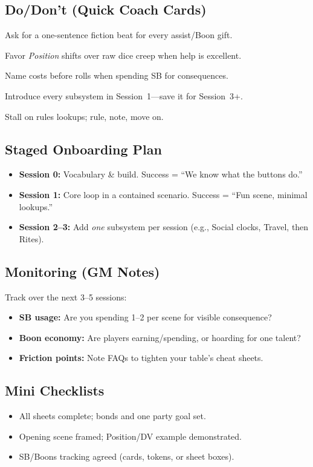 \subsection*{Do/Don’t (Quick Coach Cards)}
\begin{description}[leftmargin=1.6em]
  \item[\textbf{Do}] Ask for a one-sentence fiction beat for every assist/Boon gift.
  \item[\textbf{Do}] Favor \emph{Position} shifts over raw dice creep when help is excellent.
  \item[\textbf{Do}] Name costs before rolls when spending SB for consequences.
  \item[\textbf{Don’t}] Introduce every subsystem in Session~1—save it for Session~3+.
  \item[\textbf{Don’t}] Stall on rules lookups; rule, note, move on.
\end{description}

\subsection*{Staged Onboarding Plan}
\begin{itemize}
  \item \textbf{Session 0:} Vocabulary \& build. Success = “We know what the buttons do.”
  \item \textbf{Session 1:} Core loop in a contained scenario. Success = “Fun scene, minimal lookups.”
  \item \textbf{Session 2–3:} Add \emph{one} subsystem per session (e.g., Social clocks, Travel, then Rites).
\end{itemize}

\subsection*{Monitoring (GM Notes)}
Track over the next 3–5 sessions:
\begin{itemize}
  \item \textbf{SB usage:} Are you spending 1–2 per scene for visible consequence?
  \item \textbf{Boon economy:} Are players earning/spending, or hoarding for one talent?
  \item \textbf{Friction points:} Note FAQs to tighten your table’s cheat sheets.
\end{itemize}

\subsection*{Mini Checklists}
\begin{tcolorbox}[title={Session 0 Done When},colback=gray!5,colframe=black]
\begin{itemize}
  \item All sheets complete; bonds and one party goal set.
  \item Opening scene framed; Position/DV example demonstrated.
  \item SB/Boons tracking agreed (cards, tokens, or sheet boxes).
\end{itemize}
\end{tcolorbox}

